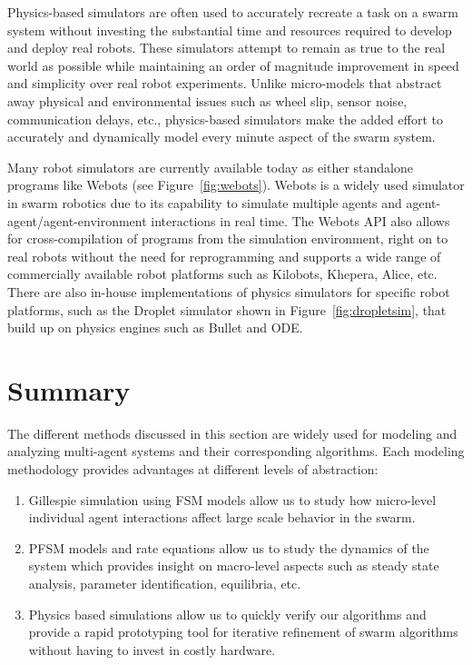 \documentclass[defaultstyle,12pt]{proposal}
\begin{document}
Physics-based simulators are often used to accurately recreate a task on a swarm system without investing the substantial time and resources required to develop and deploy real robots. These simulators attempt to remain as true to the real world as possible while maintaining an order of magnitude improvement in speed and simplicity over real robot experiments. Unlike micro-models that abstract away physical and environmental issues such as wheel slip, sensor noise, communication delays, etc., physics-based simulators make the added effort to accurately and dynamically model every minute aspect of the swarm system.

Many robot simulators are currently available today as either standalone programs like Webots (see Figure~\ref{fig:webots}). Webots is a widely used simulator in swarm robotics due to its capability to simulate multiple agents and agent-agent/agent-environment interactions in real time. The Webots API also allows for cross-compilation of programs from the simulation environment, right on to real robots without the need for reprogramming and supports a wide range of commercially available robot platforms such as Kilobots, Khepera, Alice, etc. There are also in-house implementations of physics simulators for specific robot platforms, such as the Droplet simulator shown in Figure~\ref{fig:dropletsim}, that build up on physics engines such as Bullet and ODE.

\section{Summary}
The different methods discussed in this section are widely used for modeling and analyzing multi-agent systems and their corresponding algorithms. Each modeling methodology provides advantages at different levels of abstraction:
\begin{enumerate}
	\item Gillespie simulation using FSM models allow us to study how micro-level individual agent interactions affect large scale behavior in the swarm.
	\item PFSM models and rate equations allow us to study the dynamics of the system which provides insight on macro-level aspects such as steady state analysis, parameter identification, equilibria, etc.
	\item Physics based simulations allow us to quickly verify our algorithms and provide a rapid prototyping tool for iterative refinement of swarm algorithms without having to invest in costly hardware.
\end{enumerate}
\end{document}
